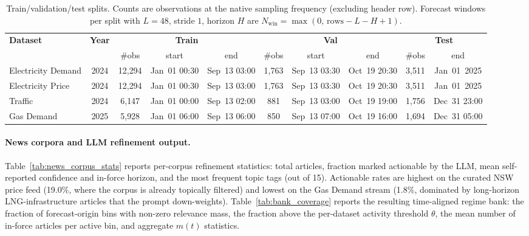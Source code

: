 \documentclass{article}
\begin{document}
\begin{table}[h]
    \centering
    \caption{Train/validation/test splits. Counts are observations at the native sampling frequency (excluding header row). Forecast windows per split with $L{=}48$, stride $1$, horizon $H$ are $N_{\text{win}}{=}\max(0,\,\text{rows}-L-H+1)$.}
    \label{tab:dataset_splits}
    \scriptsize
    \setlength{\tabcolsep}{5pt}
    \renewcommand{\arraystretch}{1.05}
    \begin{tabular}{lccccccccc}
        \toprule
        \multirow{2}{*}{\textbf{Dataset}} & \multirow{2}{*}{\textbf{Year}} & \multicolumn{3}{c}{\textbf{Train}} & \multicolumn{3}{c}{\textbf{Val}} & \multicolumn{2}{c}{\textbf{Test}} \\
        \cmidrule(lr){3-5}\cmidrule(lr){6-8}\cmidrule(lr){9-10}
        & & \#obs & start & end & \#obs & start & end & \#obs & end \\
        \midrule
        Electricity Demand & 2024 & 12{,}294 & Jan~01 00:30 & Sep~13 03:00 & 1{,}763 & Sep~13 03:30 & Oct~19 20:30 & 3{,}511 & Jan~01~2025 \\
        Electricity Price  & 2024 & 12{,}294 & Jan~01 00:30 & Sep~13 03:00 & 1{,}763 & Sep~13 03:30 & Oct~19 20:30 & 3{,}511 & Jan~01~2025 \\
        Traffic            & 2024 & 6{,}147  & Jan~01 00:00 & Sep~13 02:00 & 881    & Sep~13 03:00 & Oct~19 19:00 & 1{,}756 & Dec~31 23:00 \\
        Gas Demand         & 2025 & 5{,}928  & Jan~01 06:00 & Sep~13 06:00 & 850    & Sep~13 07:00 & Oct~19 16:00 & 1{,}694 & Dec~31 05:00 \\
        \bottomrule
    \end{tabular}
\end{table}

\paragraph{News corpora and LLM refinement output.}
Table~\ref{tab:news_corpus_stats} reports per-corpus refinement statistics: total articles, fraction marked actionable by the LLM, mean self-reported confidence and in-force horizon, and the most frequent topic tags (out of 15). Actionable rates are highest on the curated NSW price feed (19.0\%, where the corpus is already topically filtered) and lowest on the Gas Demand stream (1.8\%, dominated by long-horizon LNG-infrastructure articles that the prompt down-weights). Table~\ref{tab:bank_coverage} reports the resulting time-aligned regime bank: the fraction of forecast-origin bins with non-zero relevance mass, the fraction above the per-dataset activity threshold $\theta$, the mean number of in-force articles per active bin, and aggregate $m(t)$ statistics.
\end{document}
